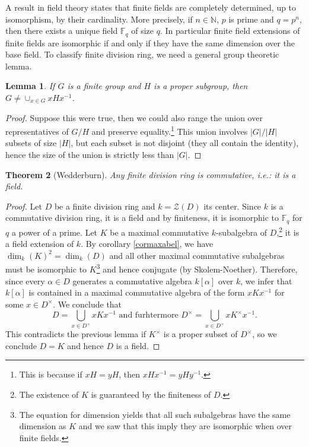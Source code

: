 \documentclass{tufte-handout} %
\newtheorem{thm}{Theorem}
\newtheorem{lem}[thm]{Lemma}
\theoremstyle{definition}
\theoremstyle{remark}
\newcommand{\N}{\mathbb{N}}
\newcommand{\mZ}{\mathcal{Z}}
\newcommand{\F}{\mathbb{F}}
\begin{document}
A result in field theory states that finite fields are completely determined, up to isomorphism, by their cardinality. More precisely, if $n \in \N$, $p$ is prime and $q = p^n$, then there exists a unique field $\F_q$ of size $q$. In particular finite field extensions of finite fields are isomorphic if and only if they have the same dimension over the base field. To classify finite division ring, we need a general group theoretic lemma.
\begin{lem}
	If $G$ is a finite group and $H$ is a proper subgroup, then $G \neq \cup_{x \in G} xHx^{-1}$.
\end{lem}
\begin{proof}
	Suppose this were true, then we could also range the union over representatives of $G/H$ and preserve equality.\footnote{This is because if $xH = yH$, then $xHx^{-1} = yHy^{-1}$.} This union involves $|G|/|H|$ subsets of size $|H|$, but each subset is not disjoint (they all contain the identity), hence the size of the union is strictly less than $|G|$.
\end{proof}
\begin{thm}[Wedderburn]\label{thmwedd}
	Any finite division ring is commutative, i.e.: it is a field.
\end{thm}
\begin{proof}
	Let $D$ be a finite division ring and $k = \mZ(D)$ its center. Since $k$ is a commutative division ring, it is a field and by finiteness, it is isomorphic to $\F_q$ for $q$ a power of a prime. Let $K$ be a maximal commutative $k$-subalgebra of $D$,\footnote{The existence of $K$ is guaranteed by the finiteness of $D$.} it is a field extension of $k$. By corollary \ref{cormaxabel}, we have $\dim_k(K)^2 = \dim_k(D)$ and all other maximal commutative subalgebras must be isomorphic to $K$\footnote{The equation for dimension yields that all such subalgebras have the same dimension as $K$ and we saw that this imply they are isomorphic when over finite fields.} and hence conjugate (by Skolem-Noether). Therefore, since every $\alpha \in D$ generates a commutative algebra $k[\alpha]$ over $k$, we infer that $k[\alpha]$ is contained in a maximal commutative algebra of the form $xKx^{-1}$ for some $x \in D^{\times}$. We conclude that  
	\[D = \bigcup_{x \in D^{\times}} xKx^{-1} \text{ and furhtermore } D^{\times} = \bigcup_{x \in D^{\times}} xK^{\times}x^{-1}.\]
	This contradicts the previous lemma if $K^{\times}$ is a proper subset of $D^{\times}$, so we conclude $D = K$ and hence $D$ is a field.
\end{proof}
\end{document}
